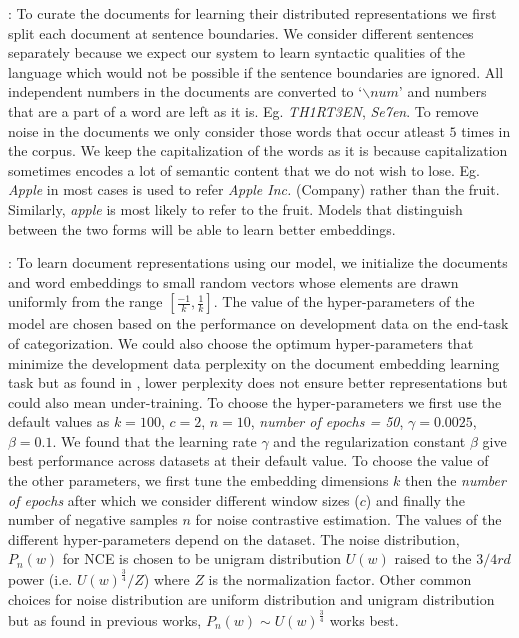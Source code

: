  : To curate the documents for learning their distributed representations we first split each document at sentence boundaries. We consider different sentences separately because we expect our system to learn syntactic qualities of the language which would not be possible if the sentence boundaries are ignored.
All independent numbers in the documents are converted to `$\backslash num$' and numbers that are a part of a word are left as it is. Eg. \emph{TH1RT3EN}, \emph{Se7en}. 
To remove noise in the documents we only consider those words that occur atleast $5$ times in the corpus.
We keep the capitalization of the words as it is because capitalization sometimes encodes a lot of semantic content that we do not wish to lose. Eg. \emph{Apple} in most cases is used to refer \emph{Apple Inc.} (Company) rather than the fruit. Similarly, \emph{apple} is most likely to refer to the fruit. Models that distinguish between the two forms will be able to learn better embeddings.

 : To learn document representations using our model, we initialize the documents and word embeddings to small random vectors whose elements are drawn uniformly from the range $[\frac{-1}{k}, \frac{1}{k}]$. 
The value of the hyper-parameters of the model are chosen based on the performance on development data on the end-task of categorization. 
We could also choose the optimum hyper-parameters that minimize the development data perplexity on the document embedding learning task but as found in \citep{mnih2013learning}, lower perplexity does not ensure better representations but could also mean under-training. 
To choose the hyper-parameters we first use the default values as $k = 100$, $c = 2$, $n = 10$, \emph{number of epochs = 50}, $\gamma = 0.0025$, $\beta = 0.1$. 
We found that the learning rate $\gamma$ and the regularization constant $\beta$ give best performance across datasets at their default value. To choose the value of the other parameters, we first tune the embedding dimensions $k$ then the \emph{number of epochs} after which we consider different window sizes ($c$) and finally the number of negative samples $n$ for noise contrastive estimation. The values of the different hyper-parameters depend on the dataset. 
The noise distribution, $P_{n}(w)$ for NCE is chosen to be unigram distribution $U(w)$ raised to the $3/4rd$ power (i.e. $U(w)^{\frac{3}{4}}/Z$) where $Z$ is the normalization factor. Other common choices for noise distribution are uniform distribution and unigram distribution but as found in previous works, $P_{n}(w) \sim U(w)^{\frac{3}{4}}$ works best.

